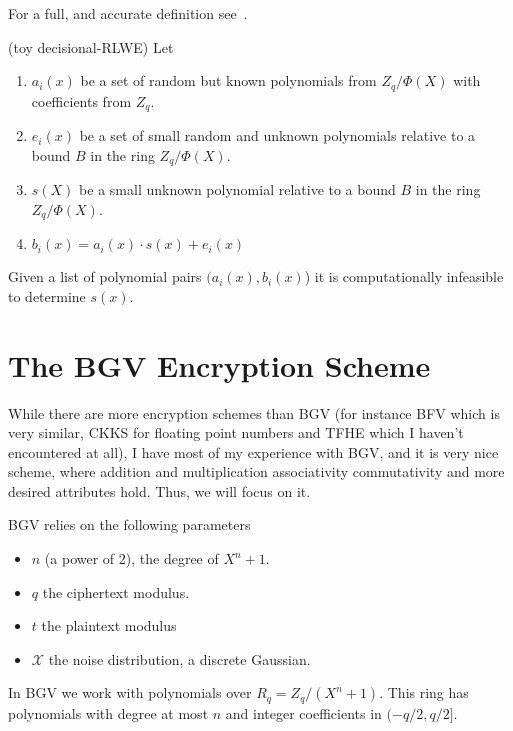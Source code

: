 For a full, and accurate definition see~\cite[def 3.3]{RLWE}.
\begin{definition} (toy decisional-RLWE)
    Let 
    \begin{enumerate}
        \item $a_i(x)$ be a set of random but known polynomials from $Z_q/\Phi(X)$ with 
        coefficients from $Z_q$.
        \item  $e_i(x)$ be a set of small random and unknown polynomials 
        relative to a bound $B$ in the ring $Z_q/\Phi(X)$.
        \item $s(X)$ be a small unknown polynomial 
        relative to a bound $B$ in the ring $Z_q/\Phi(X)$.
        \item $b_i(x)=a_i(x)\cdot s(x) + e_i(x)$
    \end{enumerate}
    
    Given a list of polynomial pairs $(a_i(x),b_i(x)$) it is computationally infeasible 
    to determine $s(x)$.
\end{definition}

\section{The BGV Encryption Scheme}

While there are more encryption schemes than BGV (for instance BFV which is very similar,
 CKKS for floating point numbers and TFHE which I haven't encountered at all),
I have most of my experience with BGV, and it is very nice scheme, 
where addition and multiplication associativity commutativity and more desired attributes 
hold.  Thus, we will focus on it.


BGV relies on the following parameters
\begin{itemize}
    \item $n$ (a power of 2), the degree of $X^n+1$.
    \item $q$ the ciphertext modulus.
    \item $t$ the plaintext modulus
    \item $\mathcal{X}$ the noise distribution, a discrete Gaussian.
\end{itemize}

In BGV we work with polynomials over $R_q=Z_q/(X^n+1)$.
This ring has polynomials with degree at most $n$ and integer coefficients in $(-q/2,q/2]$.

